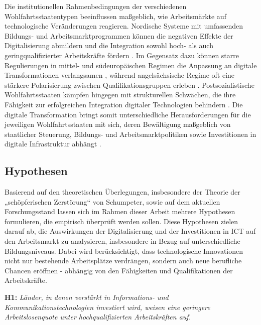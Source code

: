 Die institutionellen Rahmenbedingungen der verschiedenen Wohlfahrtsstaatentypen beeinflussen 
maßgeblich, wie Arbeitsmärkte auf technologische Veränderungen reagieren. Nordische Systeme 
mit umfassenden Bildungs- und Arbeitsmarktprogrammen können die negativen Effekte der 
Digitalisierung abmildern und die Integration sowohl hoch- als auch geringqualifizierter 
Arbeitskräfte fördern \parencite[S. 27–30]{espingandersen1990thethree}. Im Gegensatz dazu 
können starre Regulierungen in mittel- und südeuropäischen Regimen die Anpassung an 
digitale Transformationen verlangsamen \parencite[S. 155]{ferrera1996thesouthern}, während 
angelsächsische Regime oft eine stärkere Polarisierung zwischen Qualifikationsgruppen 
erleben \parencite[S. 3–5]{hall2001varieties}. Postsozialistische Wohlfahrtsstaaten 
kämpfen hingegen mit strukturellen Schwächen, die ihre Fähigkeit zur erfolgreichen 
Integration digitaler Technologien behindern \parencite[S. 88–93]{cerami2006socialpolicy}. 
Die digitale Transformation bringt somit unterschiedliche Herausforderungen für die 
jeweiligen Wohlfahrtsstaaten mit sich, deren Bewältigung maßgeblich von staatlicher 
Steuerung, Bildungs- und Arbeitsmarktpolitiken sowie Investitionen in digitale 
Infrastruktur abhängt \parencite[S. 23]{oecd2020digital}.


\subsection{Hypothesen}

Basierend auf den theoretischen Überlegungen, insbesondere der Theorie der „schöpferischen 
Zerstörung“ von Schumpeter, sowie auf dem aktuellen Forschungsstand lassen sich im Rahmen 
dieser Arbeit mehrere Hypothesen formulieren, die empirisch überprüft werden sollen. Diese 
Hypothesen zielen darauf ab, die Auswirkungen der Digitalisierung und der Investitionen in 
\ac{ICT} auf den Arbeitsmarkt zu analysieren, insbesondere in Bezug auf unterschiedliche 
Bildungsniveaus. Dabei wird berücksichtigt, dass technologische Innovationen nicht nur 
bestehende Arbeitsplätze verdrängen, sondern auch neue berufliche Chancen eröffnen - 
abhängig von den Fähigkeiten und Qualifikationen der Arbeitskräfte.

\textbf{H1:} \textit{ Länder, in denen verstärkt in Informations- und Kommunikationstechnologien 
investiert wird, weisen eine geringere Arbeitslosenquote unter hochqualifizierten 
Arbeitskräften auf.}


